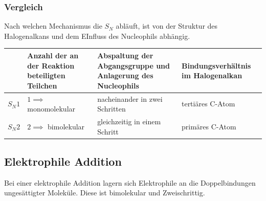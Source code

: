 \documentclass[a4paper]{article}
\begin{document}
\subsubsection{Vergleich}
Nach welchen Mechanismus die $S_N$ abläuft, ist von der Struktur des Halogenalkans und dem EInfluss des
Nucleophils abhängig. \\
\begin{center}
\begin{tabular}{c | p{27.5mm} | p{27.5mm} | p{27.5mm} |}
    \quad &Anzahl der an der Reaktion beteiligten Teilchen &Abspaltung der Abgangsgruppe und Anlagerung des Nucleophils &Bindungsverhältnis im Halogenalkan \\ \hline
    $S_N1$ &$1 \implies$ monomolekular &nacheinander in zwei Schritten &tertiäres C-Atom \\ \hline
    $S_N2$ &$2 \implies$ bimolekular &gleichzeitig in einem Schritt &primäres C-Atom
\end{tabular}
\end{center}

\subsection{Elektrophile Addition}
Bei einer elektrophile Addition lagern sich Elektrophile an die Doppelbindungen ungesättigter Moleküle.
Diese ist bimolekular und Zweischrittig.
\end{document}

